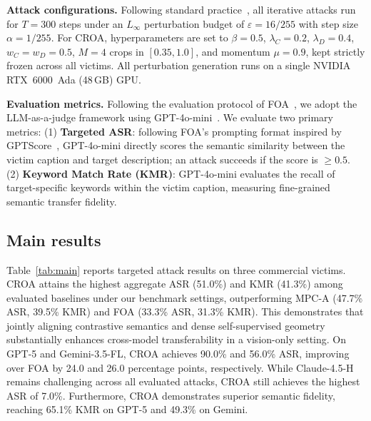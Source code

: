 \documentclass{article}
\newcommand{\ours}{\textsc{CROA}}
\begin{document}
\textbf{Attack configurations.} Following standard practice~\cite{foa,mpcattack}, all iterative attacks run for $T=300$ steps under an $L_\infty$ perturbation budget of $\varepsilon=16/255$ with step size $\alpha=1/255$. For \ours{}, hyperparameters are set to $\beta=0.5$, $\lambda_C=0.2$, $\lambda_D=0.4$, $w_C=w_D=0.5$, $M=4$ crops in $[0.35,1.0]$, and momentum $\mu=0.9$, kept strictly frozen across all victims. All perturbation generation runs on a single NVIDIA RTX~6000~Ada (48\,GB) GPU.

\textbf{Evaluation metrics.} Following the evaluation protocol of FOA~\cite{foa}, we adopt the LLM-as-a-judge framework using GPT-4o-mini~\cite{gpt4}. We evaluate two primary metrics: (1) \textbf{Targeted ASR}: following FOA's prompting format inspired by GPTScore~\cite{gptscore}, GPT-4o-mini directly scores the semantic similarity between the victim caption and target description; an attack succeeds if the score is $\ge 0.5$. (2) \textbf{Keyword Match Rate (KMR)}: GPT-4o-mini evaluates the recall of target-specific keywords within the victim caption, measuring fine-grained semantic transfer fidelity.

\subsection{Main results}
Table~\ref{tab:main} reports targeted attack results on three commercial victims. \ours{} attains the highest aggregate ASR (51.0\%) and KMR (41.3\%) among evaluated baselines under our benchmark settings, outperforming MPC-A (47.7\% ASR, 39.5\% KMR) and FOA (33.3\% ASR, 31.3\% KMR). This demonstrates that jointly aligning contrastive semantics and dense self-supervised geometry substantially enhances cross-model transferability in a vision-only setting. On GPT-5 and Gemini-3.5-FL, \ours{} achieves 90.0\% and 56.0\% ASR, improving over FOA by 24.0 and 26.0 percentage points, respectively. While Claude-4.5-H remains challenging across all evaluated attacks, \ours{} still achieves the highest ASR of 7.0\%. Furthermore, \ours{} demonstrates superior semantic fidelity, reaching 65.1\% KMR on GPT-5 and 49.3\% on Gemini.
\end{document}
